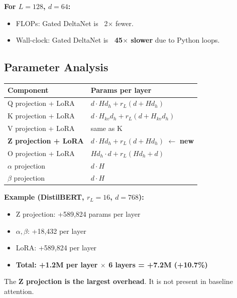 \textbf{For $L = 128$, $d = 64$:}
\begin{itemize}
\item FLOPs: Gated DeltaNet is ~2$\times$ fewer.
\item Wall-clock: Gated DeltaNet is \textbf{~45$\times$ slower} due to Python loops.

\end{itemize}
\subsection{Parameter Analysis}

\begin{table}[H]
\centering
\small
\begin{tabular}{ll}
\toprule
\textbf{Component} & \textbf{Params per layer} \\
\midrule
Q projection + LoRA & $d \cdot H d_h + r_L(d + H d_h)$ \\
K projection + LoRA & $d \cdot H_{kv} d_h + r_L(d + H_{kv} d_h)$ \\
V projection + LoRA & same as K \\
\textbf{Z projection + LoRA} & $d \cdot H d_h + r_L(d + H d_h)$ $\leftarrow$ \textbf{new} \\
O projection + LoRA & $H d_h \cdot d + r_L(H d_h + d)$ \\
$\alpha$ projection & $d \cdot H$ \\
$\beta$ projection & $d \cdot H$ \\
\bottomrule
\end{tabular}
\end{table}

\textbf{Example (DistilBERT, $r_L = 16$, $d = 768$):}
\begin{itemize}
\item Z projection: +589,824 params per layer
\item $\alpha, \beta$: +18,432 per layer
\item LoRA: +589,824 per layer
\item \textbf{Total: +1.2M per layer $\times$ 6 layers = +7.2M (+10.7\%)}

\end{itemize}
The \textbf{Z projection is the largest overhead}. It is not present in baseline 
attention.


